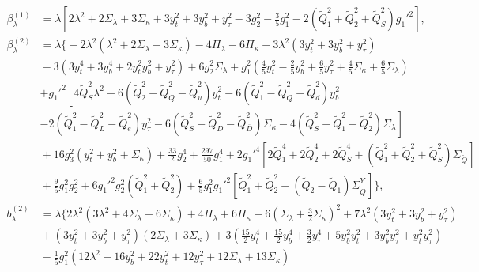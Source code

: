 \documentclass[preprint,amsmath,amssymb,aps,superscriptaddress,prd,showpacs,floatfix,nofootinbib]{revtex4-1}
\begin{document}
\begin{subequations}\label{eq:USSMLambdaBetas}
\begin{align}
\beta_\lambda^{(1)}&=\lambda  \left[2\lambda ^2+2 \Sigma_\lambda +3 \Sigma_\kappa +3 y_t^2+3 y_b^2+y_{\tau }^2-3 g_2^2-\frac{3}{5} g_1^2 -2 \left ( \tilde{Q}_1^2 + \tilde{Q}_2^2 + \tilde{Q}_S^2\right )g_1'^2 \right],\label{eq:USSMLambdaBetaOneLoop}\\
\beta_\lambda^{(2)}&=\lambda \bigg \{ -2\lambda^2\left ( \lambda^2+2\Sigma_\lambda+3\Sigma_\kappa\right )-4\Pi_\lambda-6\Pi_\kappa-3\lambda^2\left ( 3y_t^2+3y_b^2+y_\tau^2\right ) \nonumber\\
&{} -3\left ( 3y_t^4+3y_b^4+2y_t^2y_b^2+y_\tau^2 \right )+6g_2^2\Sigma_\lambda+g_1^2\left ( \frac{4}{5}y_t^2-\frac{2}{5}y_b^2+\frac{6}{5}y_\tau^2+\frac{4}{5}\Sigma_\kappa +\frac{6}{5}\Sigma_\lambda\right )\nonumber\\
&{}\left.+g_1'^2\left [ 4\tilde{Q}_S^2\lambda^2 -6\left ( \tilde{Q}_2^2-\tilde{Q}_Q^2-\tilde{Q}_u^2\right )y_t^2-6\left ( \tilde{Q}_1^2-\tilde{Q}_Q^2-\tilde{Q}_d^2\right )y_b^2 \right.\right.\nonumber\\
&{}\left.-2\left ( \tilde{Q}_1^2-\tilde{Q}_L^2-\tilde{Q}_e^2\right )y_\tau^2-6\left ( \tilde{Q}_S^2-\tilde{Q}_D^2-\tilde{Q}_{\overline{D}}^2 \right )\Sigma_\kappa-4\left ( \tilde{Q}_S^2-\tilde{Q}_1^2-\tilde{Q}_2^2\right )\Sigma_\lambda\right ]\nonumber\\
&{}+16g_3^2\left ( y_t^2+y_b^2+\Sigma_\kappa\right ) +\frac{33}{2}g_2^4+\frac{297}{50}g_1^4+2g_1'^4\left [ 2\tilde{Q}_1^4+2\tilde{Q}_2^4+2\tilde{Q}_S^4+\left ( \tilde{Q}_1^2+\tilde{Q}_2^2+\tilde{Q}_S^2\right )\Sigma_{\tilde{Q}}\right ]\nonumber\\
&{}+\frac{9}{5}g_1^2g_2^2+6g_1'^2g_2^2\left ( \tilde{Q}_1^2+\tilde{Q}_2^2\right )+\frac{6}{5}g_1^2g_1'^2\left [\tilde{Q}_1^2+\tilde{Q}_2^2+\left ( \tilde{Q}_2-\tilde{Q}_1\right )\Sigma_{\tilde{Q}}^Y\right ]\bigg \},\label{eq:USSMLambdaBetaTwoLoop}\\
b_\lambda^{(2)}&=\lambda \bigg \{ 2\lambda^2\left ( 3\lambda^2 +4\Sigma_\lambda +6\Sigma_\kappa \right )+4\Pi_\lambda + 6\Pi_\kappa +6\left ( \Sigma_\lambda+\frac{3}{2}\Sigma_\kappa\right )^2+7\lambda^2\left ( 3y_t^2+3y_b^2+y_\tau^2\right )\nonumber\\
&{}+\left ( 3y_t^2+3y_b^2+y_\tau^2\right )\left (2\Sigma_\lambda+3\Sigma_\kappa\right ) +3\left ( \frac{15}{2}y_t^4+\frac{15}{2}y_b^4+\frac{3}{2}y_\tau^4 +5y_b^2y_t^2 +3y_b^2y_\tau^2 +y_t^2y_\tau^2\right )\nonumber\\
&{}-\frac{1}{5}g_1^2\left ( 12\lambda^2+16y_b^2+22y_t^2+12y_\tau^2+12\Sigma_\lambda +13\Sigma_\kappa \right )\nonumber\\

\end{align}
\end{subequations}
\end{document}
